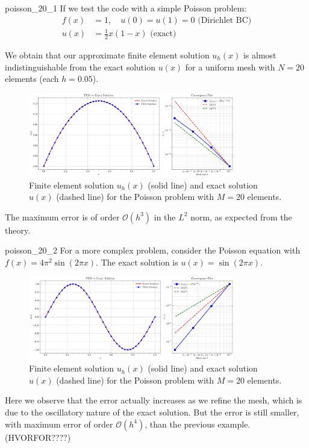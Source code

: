 \documentclass[a4paper,10pt]{article}
\begin{document}
\begin{example}{}{poisson_20_1}
	If we test the code with a simple Poisson problem:
	\begin{align*}
	f(x) &= 1, \quad u(0)=u(1)=0 \text{ (Dirichlet BC)}\\
	u(x) &= \frac{1}{2}x(1-x) \text{ (exact)}
	\end{align*}

	We obtain that our approximate finite element solution \(u_h(x)\) is almost indistinguishable from the exact solution \(u(x)\) for a uniform mesh with \(N=20\) elements (each \(h=0.05\)).
	\begin{figure}[H]
		\centering
		\includegraphics[width=0.8\textwidth]{figures/fem_solution_20_1.png}
		\caption{Finite element solution \(u_h(x)\) (solid line) and exact solution \(u(x)\) (dashed line) for the Poisson problem with \(M=20\) elements.}
	\end{figure}
	The maximum error is of order \(\mathcal{O}(h^3)\) in the \(L^2\) norm, as expected from the theory.
\end{example}

\begin{example}{}{poisson_20_2}
	For a more complex problem, consider the Poisson equation with \(f(x) = 4\pi^2\sin(2\pi x)\). 
	The exact solution is \(u(x) = \sin(2\pi x)\).
	\begin{figure}[H]
		\centering
		\includegraphics[width=0.8\textwidth]{figures/fem_solution_20_2.png}
		\caption{Finite element solution \(u_h(x)\) (solid line) and exact solution \(u(x)\) (dashed line) for the Poisson problem with \(M=20\) elements.}
	\end{figure}
	Here we observe that the error actually increases as we refine the mesh, which is due to the oscillatory nature of the exact solution.
	But the error is still smaller, with maximum error of order \(\mathcal{O}(h^4)\), than the previous example. (HVORFOR????)
\end{example}
\end{document}
